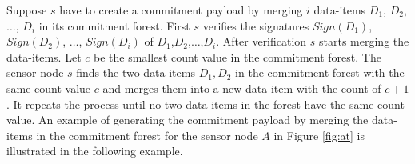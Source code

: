 	Suppose $s$ have to create a commitment payload by merging $i$ data-items $D_{1}$, $D_{2}$, $\dotsc$, $D_{i}$ in its commitment forest.
	First $s$ verifies the signatures $Sign(D_{1})$, $Sign(D_{2})$, $\dotsc$, $Sign(D_{i})$ of $D_{1}$,$D_{2}$,$\dotsc$,$D_{i}$.
	After verification $s$ starts merging the data-items.
	Let $c$ be the smallest count value in the commitment forest.
	The sensor node $s$ finds the two data-items $D_{1},D_{2}$ in the commitment forest with the same count value $c$ and merges them into a new data-item with the count of $c+1$.
	It repeats the process until no two data-items in the forest have the same count value.
	An example of generating the commitment payload by merging the data-items in the commitment forest for the sensor node $A$ in Figure \ref{fig:at} is illustrated in the following example.
